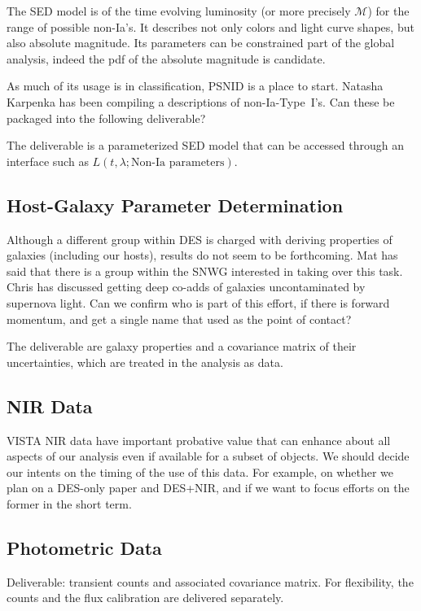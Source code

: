 \documentclass[preprint,3p]{elsarticle}
\begin{document}
The SED model is of the time evolving luminosity (or more precisely $\mathcal{M}$)
for the range of possible non-Ia's.  It describes not only colors and light curve shapes,
but also absolute magnitude.  Its parameters can be constrained part of the
global analysis, indeed the pdf of the absolute magnitude is candidate.

As much of its usage is in classification, PSNID is a place to start.
Natasha Karpenka has been compiling a descriptions of non-Ia-Type~I's.  Can these
be packaged into the following deliverable?

The deliverable is a parameterized SED model that can be accessed through
an interface such as $L(t,\lambda; \text{Non-Ia parameters})$. 

\subsection{Host-Galaxy Parameter Determination}
Although a different group within DES is charged with deriving properties
of galaxies (including our hosts), results do not seem to be forthcoming.
Mat has said that there is a group within the SNWG interested in
taking over this task.  Chris has discussed getting deep
co-adds of galaxies uncontaminated by supernova light.
Can we confirm who is part of this effort, if there is forward momentum,
and get a single name that used as the point of contact?

The deliverable are galaxy properties and a covariance matrix of their uncertainties,
which are treated in the analysis as data.

\subsection{NIR Data}
VISTA NIR data have important probative value that can enhance about all aspects
of our analysis even if available for a subset of objects.
We should decide our intents on the timing of the use of this data.
For example, on whether we plan on a DES-only paper and DES+NIR, and if
we want to focus efforts on the former in the short term.

\subsection{Photometric Data}

Deliverable:
transient counts and associated covariance matrix.  For flexibility, the counts and the
flux calibration are delivered separately.
\end{document}
